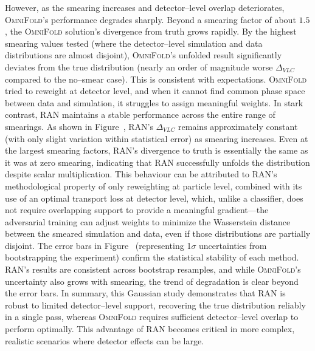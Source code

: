         However, as the smearing increases and detector--level overlap deteriorates, \textsc{OmniFold}’s performance degrades sharply.
        Beyond a smearing factor of about $1.5$, the \textsc{OmniFold} solution’s divergence from truth grows rapidly.
        By the highest smearing values tested (where the detector--level simulation and data distributions are almost disjoint), \textsc{OmniFold}’s unfolded result significantly deviates from the true distribution (nearly an order of magnitude worse $\Delta_{VLC}$ compared to the no--smear case).
        This is consistent with expectations.
        \textsc{OmniFold} tried to reweight at detector level, and when it cannot find common phase space between data and simulation, it struggles to assign meaningful weights.
        In stark contrast, RAN maintains a stable performance across the entire range of smearings.
        As shown in Figure~, RAN's $\Delta_{VLC}$ remains approximately constant (with only slight variation within statistical error) as smearing increases.
        Even at the largest smearing factors, RAN's divergence to truth is essentially the same as it was at zero smearing, indicating that RAN successfully unfolds the distribution despite scalar multiplication.
        This behaviour can be attributed to RAN's methodological property of only reweighting at particle level, combined with its use of an optimal transport loss at detector level, which, unlike a classifier, does not require overlapping support to provide a meaningful gradient---the adversarial training can adjust weights to minimize the Wasserstein distance between the smeared simulation and data, even if those distributions are partially disjoint.
        The error bars in Figure~ (representing 1$\sigma$ uncertainties from bootstrapping the experiment) confirm the statistical stability of each method.
        RAN’s results are consistent across bootstrap resamples, and while \textsc{OmniFold}’s uncertainty also grows with smearing, the trend of degradation is clear beyond the error bars.
        In summary, this Gaussian study demonstrates that RAN is robust to limited detector--level support, recovering the true distribution reliably in a single pass, whereas \textsc{OmniFold} requires sufficient detector--level overlap to perform optimally. This advantage of RAN becomes critical in more complex, realistic scenarios where detector effects can be large.
